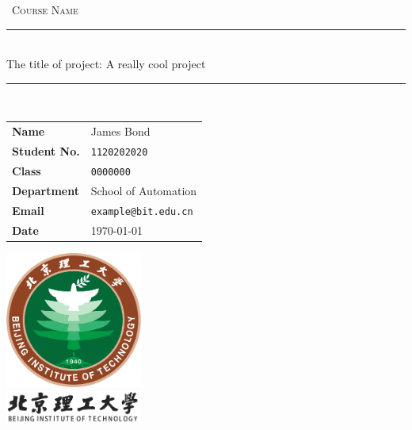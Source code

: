 \documentclass[12pt,english,openany,a4paper]{book}
\begin{document}
	
	
	\begin{titlepage}
		\clearpage\thispagestyle{empty}
		\centering
		\vspace{1cm}
		
		{\
			\textsc{Course Name}
		}
		\vspace{2.5cm}
		
		\rule{\linewidth}{2mm} \\[0.8cm]
		{ \LARGE \sc The title of project: 
			A really cool project}\\[0.55cm]
		\rule{\linewidth}{0.6mm} \\[3.4cm]
		
		\hspace{2cm}
		\begin{tabular}{l p{5cm}}
			\textbf{Name} & James Bond \\[10pt]
			\textbf{Student No.} & \texttt{1120202020} \\[10pt]
			\textbf{Class} & \texttt{0000000} \\[10pt]
			\textbf{Department} & School of Automation \\[10pt]
			\textbf{Email} & \texttt{example@bit.edu.cn} \\[10pt]
			\textbf{Date} & \today \\            
		\end{tabular}
		
		
		\vfill
		\centering \includegraphics[width=4.5cm]{bit_logo.pdf}\\ %
		\centering \includegraphics[width=4.5cm]{logo_slogan.pdf}
		\vspace{0.5cm}
		
		
		
		
		\pagebreak
		
	\end{titlepage}
	
\end{document}
